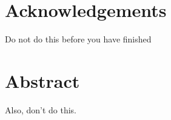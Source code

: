 \chapter*{Acknowledgements}
\label{chapter:acknowledgements}

Do not do this before you have finished

\chapter*{Abstract}
\label{chapter:abstract}

Also, don't do this.
